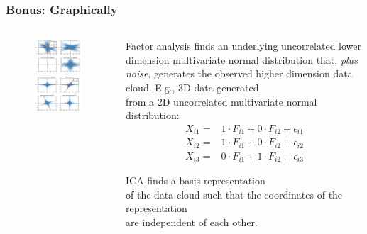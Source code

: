 \documentclass[xcolor={dvipsnames}]{beamer}
\begin{document}
\frame
{
 \frametitle{Bonus: Graphically}

\begin{columns}
\begin{column}{.5\textwidth}

\vspace{-.75cm}
\begin{figure}
\includegraphics[width=2.25in]{stuff/Q0tvQ.png} 

\includegraphics[width=2.3in]{stuff/sphx_glr_plot_ica_vs_pca_thumb.png}
\end{figure}



\end{column}
\begin{column}{.55\textwidth}

Factor analysis finds an underlying uncorrelated lower dimension multivariate normal distribution that, \emph{plus noise}, generates the observed higher dimension data cloud.  E.g., 3D data  generated\\ from a 2D uncorrelated multivariate normal distribution:
\begin{align*} %
      X_{i1} = {}&  1\cdot F_{i1} + 0\cdot F_{i2} + \epsilon_{i1} \\
      X_{i2} = {}& 1\cdot F_{i1} + 0\cdot F_{i2}  + \epsilon_{i2}\\
      X_{i3} = {}& 0\cdot F_{i1} + 1\cdot F_{i2}  + \epsilon_{i3}    
\end{align*}

ICA finds a basis representation \\of the data cloud such that the coordinates of the representation\\ are independent of each other.  

\end{column}
\end{columns}
}
\end{document}
